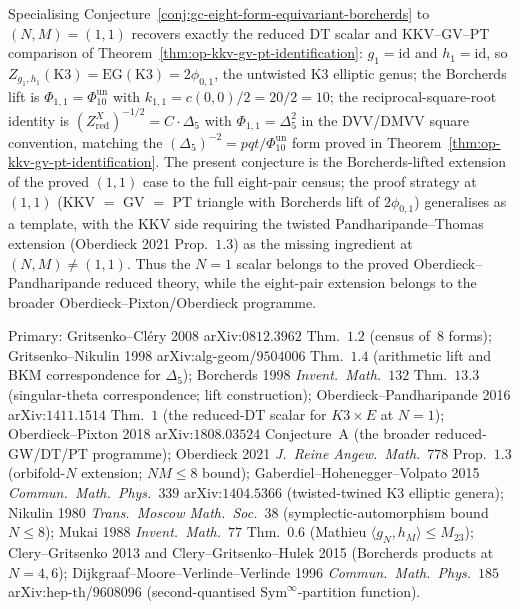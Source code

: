 \begin{remark}[\texorpdfstring{$N = 1$}{N = 1} scalar inside the Oberdieck--Pixton programme]
\label{rem:gc-n-1-case-is-op-theorem}
Specialising Conjecture~\ref{conj:gc-eight-form-equivariant-borcherds}
to $(N, M) = (1, 1)$ recovers exactly
the reduced DT scalar and KKV--GV--PT comparison of
Theorem~\ref{thm:op-kkv-gv-pt-identification}: $g_1 = \mathrm{id}$
and $h_1 = \mathrm{id}$, so
$Z_{g_1, h_1}(\mathrm{K3}) = \mathrm{EG}(\mathrm{K3}) =
2\phi_{0,1}$, the untwisted K3 elliptic genus; the Borcherds lift is
\(\Phi_{1, 1} = \Phi_{10}^{\mathrm{un}}\) with $k_{1, 1} = c(0,0)/2 = 20/2 = 10$;
the reciprocal-square-root identity is
$(Z^X_{\mathrm{red}})^{-1/2} = C \cdot \Delta_5$ with
\(\Phi_{1, 1} = \Delta_5^2\) in the DVV/DMVV square convention, matching the
\((\Delta_5)^{-2} = pqt/\Phi_{10}^{\mathrm{un}}\) form proved in
Theorem~\ref{thm:op-kkv-gv-pt-identification}. The present conjecture
is the Borcherds-lifted extension of the proved $(1, 1)$ case to the
full eight-pair census; the proof strategy at $(1, 1)$ (KKV $=$ GV
$=$ PT triangle with Borcherds lift of $2\phi_{0,1}$) generalises as
a template, with the KKV side requiring the twisted Pandharipande--Thomas
extension (Oberdieck 2021 Prop.~$1.3$) as the missing ingredient at
$(N, M) \neq (1, 1)$.
Thus the \(N=1\) scalar belongs to the proved
Oberdieck--Pandharipande reduced theory, while the eight-pair extension
belongs to the broader Oberdieck--Pixton/Oberdieck programme.
\end{remark}

\begin{remark}
\label{rem:gc-eight-form-primary-literature}
Primary:
Gritsenko--Cl\'ery 2008 arXiv:$0812.3962$ Thm.~$1.2$ (census of~$8$
forms);
Gritsenko--Nikulin 1998 arXiv:alg-geom/$9504006$ Thm.~$1.4$
(arithmetic lift and BKM correspondence for $\Delta_5$);
Borcherds 1998 \emph{Invent.\ Math.}~$132$ Thm.~$13.3$
(singular-theta correspondence; lift construction);
Oberdieck--Pandharipande 2016 arXiv:$1411.1514$ Thm.~$1$
(the reduced-DT scalar for $K3 \times E$ at \(N=1\));
Oberdieck--Pixton 2018 arXiv:$1808.03524$ Conjecture~A
(the broader reduced-GW/DT/PT programme);
Oberdieck 2021 \emph{J.\ Reine Angew.\ Math.}~$778$ Prop.~$1.3$
(orbifold-$N$ extension; $N M \leq 8$ bound);
Gaberdiel--Hohenegger--Volpato 2015 \emph{Commun.\ Math.\ Phys.}~$339$
arXiv:$1404.5366$ (twisted-twined K3 elliptic genera);
Nikulin 1980 \emph{Trans.\ Moscow Math.\ Soc.}~$38$
(symplectic-automorphism bound $N \leq 8$);
Mukai 1988 \emph{Invent.\ Math.}~$77$ Thm.~$0.6$ (Mathieu
$\langle g_N, h_M \rangle \leq M_{23}$);
Clery--Gritsenko 2013 and Clery--Gritsenko--Hulek 2015 (Borcherds
products at $N = 4, 6$);
Dijkgraaf--Moore--Verlinde--Verlinde 1996
\emph{Commun.\ Math.\ Phys.}~$185$
arXiv:hep-th/$9608096$ (second-quantised
$\mathrm{Sym}^\infty$-partition function).
\end{remark}

